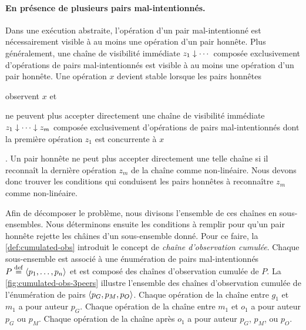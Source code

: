 \paragraph{En présence de plusieurs pairs mal-intentionnés.}
Dans une exécution abstraite, l'opération d'un pair mal-intentionné est nécessairement visible à au moins une opération d'un pair honnête.
Plus généralement, une chaîne de visibilité immédiate $z_1 \idr \dotsb$ composée exclusivement d'opérations de pairs mal-intentionnés est visible à au moins une opération d'un pair honnête.
Une opération $x$ devient stable lorsque les pairs honnêtes \begin{inlinelist}
    \item observent $x$ et
    \item ne peuvent plus accepter directement une chaîne de visibilité immédiate $z_1 \idr \dotsb \idr z_m$ composée exclusivement d'opérations de pairs mal-intentionnés dont la première opération $z_1$ est concurrente à $x$
\end{inlinelist}.
Un pair honnête ne peut plus accepter directement une telle chaîne si il reconnaît la dernière opération $z_m$ de la chaîne comme non-linéaire.
Nous devons donc trouver les conditions qui conduisent les pairs honnêtes à reconnaître $z_m$ comme non-linéaire.

Afin de décomposer le problème, nous divisons l'ensemble de ces chaînes en sous-ensembles.
Nous déterminons ensuite les conditions à remplir pour qu'un pair honnête rejette les châines d'un sous-ensemble donné.
Pour ce faire, la \autoref{def:cumulated-obs} introduit le concept de \emph{chaîne d'observation cumulée}.
Chaque sous-ensemble est associé à une énumération de pairs mal-intentionnés $P \defeq \tuple*{p_1, \dotsc, p_n}$ et est composé des chaînes d'observation cumulée de $P$.
La \autoref{fig:cumulated-obs-3peers} illustre l'ensemble des chaînes d'observation cumulée de l'énumération de pairs $\tuple*{p_G, p_M, p_O}$.
Chaque opération de la chaîne entre $g_1$ et $m_1$ a pour auteur $p_G$.
Chaque opération de la chaîne entre $m_1$ et $o_1$ a pour auteur $p_G$ ou $p_M$.
Chaque opération de la chaîne après $o_1$ a pour auteur $p_G$, $p_M$, ou $p_O$.


